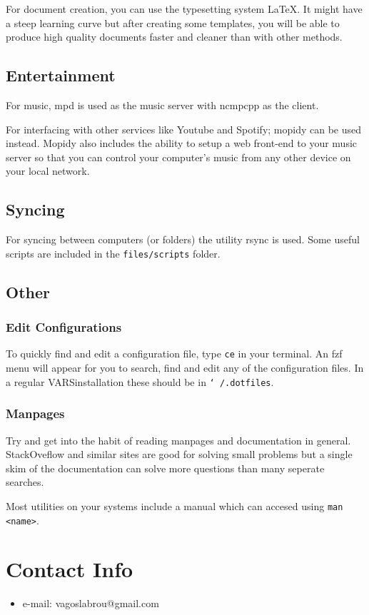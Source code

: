 \documentclass{article}
\let\src\texttt
\newcommand{\instlname}{VARS}
\begin{document}
For document creation, you can use the typesetting system \LaTeX. 
It might have a steep learning curve but after creating some templates, 
you will be able to produce high quality documents faster and cleaner 
than with other methods.

\subsection{Entertainment}
For music, mpd is used as the music server with ncmpcpp
as the client. 

For interfacing with other services like Youtube and Spotify;
mopidy can be used instead. Mopidy also includes the ability to setup a web front-end to your music server 
so that you can control your computer's music from any other device on your local network.

\subsection{Syncing}

For syncing between computers (or folders) the utility rsync is used. 
Some useful scripts are included in the \src{files/scripts} folder.

\subsection{Other}

\subsubsection{Edit Configurations}

To quickly find and edit a configuration file, type 
\src{ce} in your terminal. An fzf menu will appear for you 
to search, find and edit any of the configuration files. 
In a regular \instlname installation these should be 
in \src{\char`~/.dotfiles}.

\subsubsection{Manpages}

Try and get into the habit of reading manpages and documentation in general.
StackOveflow and similar sites are good for solving small problems but a single 
skim of the documentation can solve more questions than many seperate searches.

Most utilities on your systems include a manual which can accesed using \src{man <name>}.


\section{Contact Info}

\begin{itemize}
    \item e-mail: vagoslabrou@gmail.com
\end{itemize}

\end{document}
